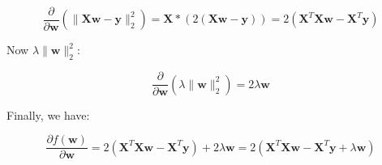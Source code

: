 \documentclass[letterpaper,12pt]{article}
\begin{document}
\begin{itemize}
        \[ \frac{\partial}{\partial \mathbf{w}} (\|\mathbf{Xw} - \mathbf{y}\|_{2}^{2}) = \mathbf{X} * (2 (\mathbf{Xw} - \mathbf{y})) = 2 (\mathbf{X}^{T} \mathbf{Xw} - \mathbf{X}^{T} \mathbf{y}) \]

    Now $\lambda \|\mathbf{w}\|_{2}^{2}$:

        \[ \frac{\partial}{\partial \mathbf{w}} (\lambda \|\mathbf{w}\|_{2}^{2}) = 2 \lambda \mathbf{w} \]

    Finally, we have:

        \[ \frac{\partial f(\mathbf{w})}{\partial \mathbf{w}} = 2 (\mathbf{X}^{T} \mathbf{Xw} - \mathbf{X}^{T} \mathbf{y}) + 2 \lambda \mathbf{w} = 2 (\mathbf{X}^{T} \mathbf{Xw} - \mathbf{X}^{T} \mathbf{y} + \lambda \mathbf{w}) \]    


\end{itemize}
\end{document}
